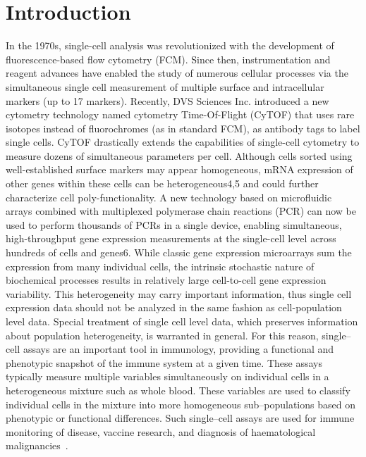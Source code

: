 \documentclass[11pt]{article}
\begin{document}
\section{Introduction}
In the 1970s, single-cell analysis was revolutionized with the development of fluorescence-based flow cytometry (FCM). Since then, instrumentation and reagent advances have enabled the study of numerous cellular processes via the simultaneous single cell measurement of multiple surface and intracellular markers (up to 17 markers). Recently, DVS Sciences Inc. introduced a new cytometry technology named cytometry Time-Of-Flight (CyTOF) that uses rare isotopes instead of fluorochromes (as in standard FCM), as antibody tags to label single cells. CyTOF drastically extends the capabilities of single-cell cytometry to measure dozens of simultaneous parameters per cell. Although cells sorted using well-established surface markers may appear homogeneous, mRNA expression of other genes within these cells can be heterogeneous4,5 and could further characterize cell poly-functionality. A new technology based on microfluidic arrays combined with multiplexed polymerase chain reactions (PCR) can now be used to perform thousands of PCRs in a single device, enabling simultaneous, high-throughput gene expression measurements at the single-cell level across hundreds of cells and genes6. While classic gene expression microarrays sum the expression from many individual cells, the intrinsic stochastic nature of biochemical processes results in relatively large cell-to-cell gene expression variability. This heterogeneity may carry important information, thus single cell expression data should not be analyzed in the same fashion as cell-population level data. Special treatment of single cell level data, which preserves information about population heterogeneity, is warranted in general. For this reason, single--cell assays are an important tool in immunology, providing a functional and phenotypic snapshot of the immune system at a given time. These assays typically measure multiple variables simultaneously on individual cells in a heterogeneous mixture such as whole blood. These variables are used to classify individual cells in the mixture into more homogeneous sub--populations based on phenotypic or functional differences. Such single--cell assays are used for immune monitoring of disease, vaccine research, and diagnosis of haematological malignancies~\cite{Altman:1996wf,Betts:2006dw,Inokuma:2007tn}.
\end{document}
